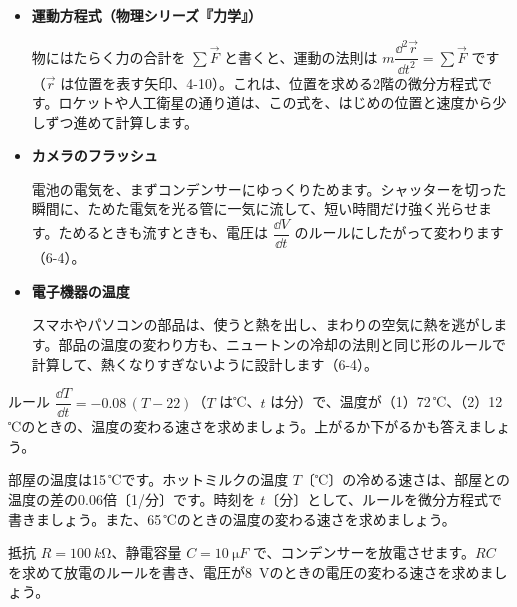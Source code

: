 \begin{butsuri}
{\begin{tikzpicture}[x=1mm, y=1mm]
\end{tikzpicture}\par}
\vspace{2pt}
\begin{itemize}[leftmargin=1.2\zw, itemsep=2pt, topsep=0pt, label={\color{bkPurple}●}]
\item \textbf{運動方程式（物理シリーズ『力学』）}\par\noindent 物にはたらく力の合計を $\sum\vec{F}$ と書くと、運動の法則は $m\dfrac{\dd^2\vec{r}}{\dd t^2}=\sum\vec{F}$ です（$\vec{r}$ は位置を表す矢印、4-10）。これは、位置を求める2階の微分方程式です。ロケットや人工衛星の通り道は、この式を、はじめの位置と速度から少しずつ進めて計算します。
\item \textbf{カメラのフラッシュ}\par\noindent 電池の電気を、まずコンデンサーにゆっくりためます。シャッターを切った瞬間に、ためた電気を光る管に一気に流して、短い時間だけ強く光らせます。ためるときも流すときも、電圧は $\dfrac{\dd V}{\dd t}$ のルールにしたがって変わります（6-4）。
\item \textbf{電子機器の温度}\par\noindent スマホやパソコンの部品は、使うと熱を出し、まわりの空気に熱を逃がします。部品の温度の変わり方も、ニュートンの冷却の法則と同じ形のルールで計算して、熱くなりすぎないように設計します（6-4）。
\end{itemize}
\end{butsuri}




\bkendproblems
{}

\bkproblem ルール $\dfrac{\dd T}{\dd t}=-0.08\,(T-22)$（$T$ は℃、$t$ は分）で、温度が（1）72\,℃、（2）12\,℃のときの、温度の変わる速さを求めましょう。上がるか下がるかも答えましょう。

\bkproblem 部屋の温度は15\,℃です。ホットミルクの温度 $T$〔℃〕の冷める速さは、部屋との温度の差の0.06倍〔1/分〕です。時刻を $t$〔分〕として、ルールを微分方程式で書きましょう。また、65\,℃のときの温度の変わる速さを求めましょう。

\bkproblem 抵抗 $R=\qty{100}{k\ohm}$、静電容量 $C=\qty{10}{\micro F}$ で、コンデンサーを放電させます。$RC$ を求めて放電のルールを書き、電圧が\qty{8}{V}のときの電圧の変わる速さを求めましょう。

